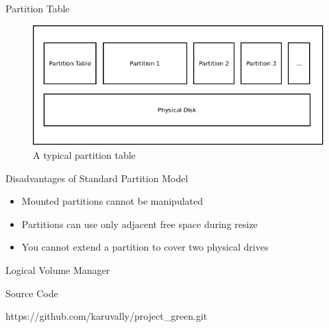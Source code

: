 \documentclass{beamer}
\begin{document}
\begin{frame}{Partition Table}
    \begin{figure}
        \includegraphics[scale=0.5]{partitions.png}
        \caption{A typical partition table}
    \end{figure}
\end{frame}

\begin{frame}{Disadvantages of Standard Partition Model}
    \begin{itemize}
        \item<2-> Mounted partitions cannot be manipulated 
        \item<3-> Partitions can use only adjacent free space during resize
        \item<4-> You cannot extend a partition to cover two physical drives
    \end{itemize}
\end{frame}

\begin{frame}{Logical Volume Manager}
\end{frame}

\begin{frame}{Source Code} 
    \begin{center}
        \large https://github.com/karuvally/project\_green.git
    \end{center}
\end{frame}
\end{document}

